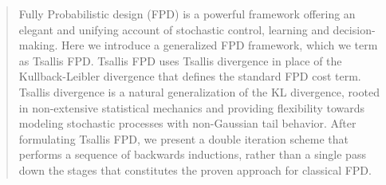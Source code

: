 \documentclass[a4paper,fleqn]{cas-sc}
\begin{document}





\begin{abstract}
Fully Probabilistic design (FPD) is a powerful framework offering an elegant and unifying account of stochastic control, learning and decision-making. Here we introduce a generalized FPD framework, which we term as Tsallis FPD. Tsallis FPD uses Tsallis divergence in place of the Kullback-Leibler divergence that defines the standard FPD cost term. Tsallis divergence is a natural generalization of the KL divergence, rooted in non-extensive statistical mechanics and providing flexibility towards modeling stochastic processes with non-Gaussian tail behavior. After formulating Tsallis FPD, we present a double iteration scheme that performs a sequence of backwards inductions, rather than a single pass down the stages that constitutes the proven approach for classical FPD. 
\end{abstract}


\end{document}
